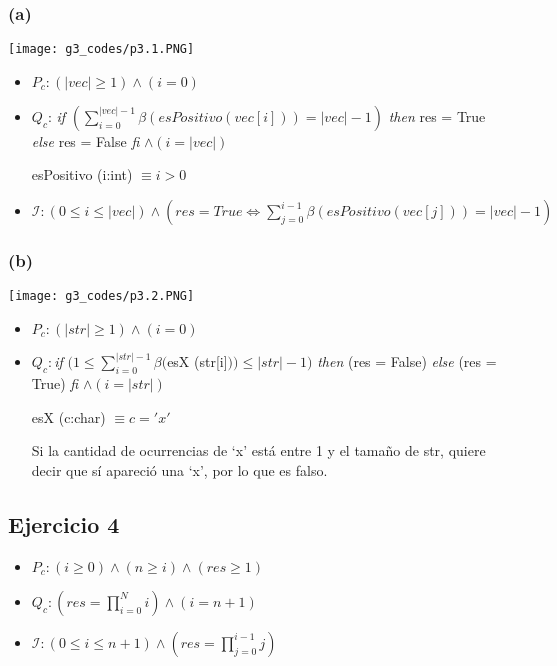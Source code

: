 \documentclass[12 pt]{article}
\begin{document}
    \subsubsection*{(a)}
        \begin{center}
            \texttt{[image: g3\_codes/p3.1.PNG]}
        \end{center}
        \begin{itemize}
            \item $P_{c}: (|vec| \geq 1) \wedge (i = 0)$
            \item $Q_{c}$: \textit{if} $\left(\sum^{|vec|-1}_{i=0}\beta (esPositivo(vec[i])) = |vec|-1\right)$ \textit{then} res = True \textit{else} res = False \textit{fi} $\wedge (i = |vec|)$

            esPositivo (i:int) $\equiv i > 0$

            \item $\mathcal{I}: (0 \leq i \leq |vec|) \wedge \left(res = True \Leftrightarrow \sum^{i-1}_{j=0} \beta (esPositivo(vec[j])) = |vec|-1 \right)$
        \end{itemize}

    \subsubsection*{(b)}
        \begin{center}
            \texttt{[image: g3\_codes/p3.2.PNG]}
        \end{center}
        \begin{itemize}
            \item $P_{c}: (|str| \geq 1) \wedge (i=0)$
            \item $Q_{c}: $\textit{if} $(1 \leq \sum^{|str|-1}_{i=0}\beta($esX (str[i]$)) \leq |str|-1)$ \textit{then} (res = False) \textit{else} (res = True) \textit{fi} $\wedge (i = |str|)$

            esX (c:char) $\equiv c = 'x'$

            Si la cantidad de ocurrencias de `x' está entre 1 y el tamaño de str, quiere decir que sí apareció una `x', por lo que es falso.
        \end{itemize}

\subsection*{Ejercicio 4}
    \begin{itemize}
        \item $P_{c}: (i \geq 0) \wedge (n \geq i) \wedge (res \geq 1)$
        \item $Q_{c}: (res = \prod^{N}_{i=0}i) \wedge (i = n + 1)$
        \item $\mathcal{I}: (0 \leq i \leq n+1) \wedge (res = \prod^{i-1}_{j=0}j)$
    \end{itemize}
\end{document}
